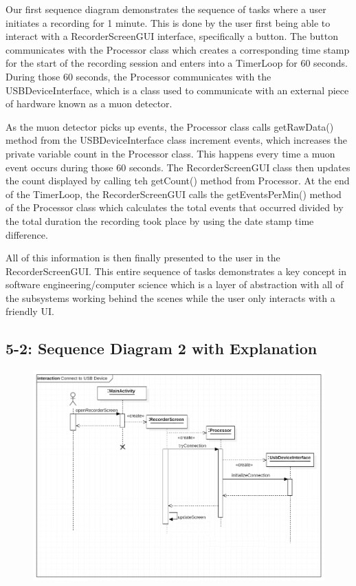 \documentclass[11pt,a4paper]{article}
\begin{document}
Our first sequence diagram demonstrates the sequence of tasks where a user initiates a recording for 1 minute. This is done by the user first being able to interact with a RecorderScreenGUI interface, specifically a button. The button communicates with the Processor class which creates a corresponding time stamp for the start of the recording session and enters into a TimerLoop for 60 seconds. During those 60 seconds, the Processor communicates with the USBDeviceInterface, which is a class used to communicate with an external piece of hardware known as a muon detector. 

As the muon detector picks up events, the Processor class calls getRawData() method from the USBDeviceInterface class increment events, which increases the private variable count in the Processor class. This happens every time a muon event occurs during those 60 seconds. The RecorderScreenGUI class then updates the count displayed by calling teh getCount() method from Processor. At the end of the TimerLoop, the RecorderScreenGUI calls the getEventsPerMin() method of the Processor class which calculates the total events that occurred divided by the total duration the recording took place by using the date stamp time difference. 

All of this information is then finally presented to the user in the RecorderScreenGUI. This entire sequence of tasks demonstrates a key concept in software engineering/computer science which is a layer of abstraction with all of the subsystems working behind the scenes while the user only interacts with a friendly UI. 

\newpage
\subsection*{5-2: Sequence Diagram 2 with Explanation}

\begin{figure}[h] \hspace{-2cm}
	\includegraphics[width=1.3\textwidth]{sequence2.png}
\end{figure}
\end{document}
